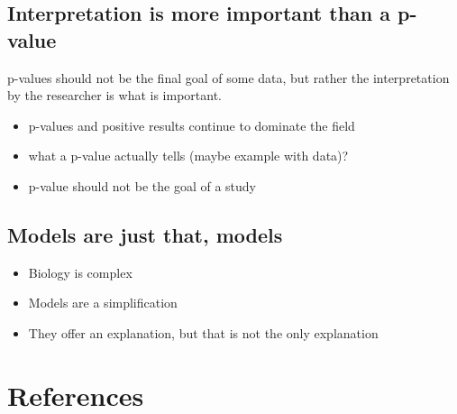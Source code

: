 \documentclass[smallextended]{svjour3}       %
\begin{document}
\normalsize

\hypertarget{interpretation-is-more-important-than-a-p-value}{%
\subsection{Interpretation is more important than a
p-value}\label{interpretation-is-more-important-than-a-p-value}}

p-values should not be the final goal of some data, but rather the
interpretation by the researcher is what is important.

\begin{itemize}
\item
  p-values and positive results continue to dominate the field
\item
  what a p-value actually tells (maybe example with data)?
\item
  p-value should not be the goal of a study
\end{itemize}

\hypertarget{models-are-just-that-models}{%
\subsection{Models are just that,
models}\label{models-are-just-that-models}}

\begin{itemize}
\item
  Biology is complex
\item
  Models are a simplification
\item
  They offer an explanation, but that is not the only explanation
\end{itemize}

\hypertarget{references}{%
\section*{References}\label{references}}
\end{document}
